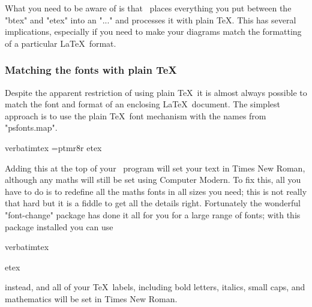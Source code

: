 \documentclass[a4paper,landscape]{article}
\begin{document}
What you need to be aware of is that \MP\ places everything you put between the "btex" and
"etex" into an "\hbox{...}" and processes it with plain \TeX.  This has several
implications, especially if you need to make your diagrams match the formatting of a
particular \LaTeX\ format.

\subsubsection{Matching the fonts with plain \TeX}

Despite the apparent restriction of using plain \TeX\ it is almost always possible
to match the font and format of an enclosing \LaTeX\ document. 
The simplest approach is to use the plain
\TeX\ font mechanism with the names from "psfonts.map".  
\begin{code}
verbatimtex
\font\rm=ptmr8r\rm
etex
\end{code}
Adding this at the top of your \MP\ program will set your text in Times New Roman,
although any maths will still be set using Computer Modern.  
To fix this, all you
have to do is to redefine all the maths fonts in all sizes you need; this is not really
that hard but it is a fiddle to get all the details right.  Fortunately
the wonderful "font-change" package has done it all for you for a large range of
fonts; with this package installed you can use
\begin{code}
verbatimtex

etex
\end{code}
instead, and all of your \TeX\ labels, including bold letters, italics, small caps,
and mathematics will be set in Times New Roman.
\end{document}
